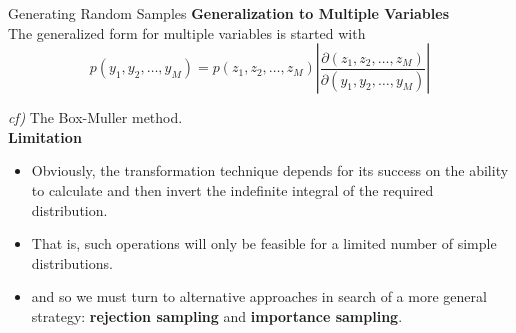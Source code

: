 \documentclass{bredelebeamer}
\begin{document}
\begin{frame}{Generating Random Samples}
  \textbf{Generalization to Multiple Variables} \\
  The generalized form for multiple variables is started with
  \begin{equation}
    p(y_1, y_2, \ldots, y_M) = p(z_1, z_2, \ldots, z_M)
    \left|
      \frac{\partial(z_1, z_2, \ldots, z_M)}{\partial(y_1, y_2, \ldots, y_M)}
    \right|
  \end{equation}

  \textit{cf)} The Box-Muller method.
  \\[1.0\baselineskip]

  \textbf{Limitation}
  \begin{itemize}
    \item Obviously, the transformation technique depends for its success
    on the ability to calculate and then invert the indefinite integral of
    the required distribution.
    \item That is, such operations will only be feasible for a limited
    number of simple distributions.
    \item and so we must turn to alternative approaches in search of a
    more general strategy: \textbf{rejection sampling} and \textbf{importance
    sampling}.
  \end{itemize}
\end{frame}
\end{document}
